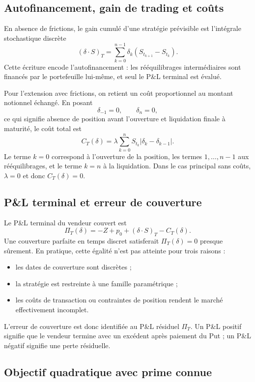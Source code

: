 \documentclass[11pt,a4paper]{article}
\begin{document}
\subsection{Autofinancement, gain de trading et coûts}

En absence de frictions, le gain cumulé d'une stratégie prévisible est
l'intégrale stochastique discrète
\[
(\delta\cdot S)_T
=\sum_{k=0}^{n-1}\delta_k\left(S_{t_{k+1}}-S_{t_k}\right).
\]
Cette écriture encode l'autofinancement : les rééquilibrages intermédiaires
sont financés par le portefeuille lui-même, et seul le P\&L terminal est évalué.

Pour l'extension avec frictions, on retient un coût proportionnel au montant
notionnel échangé. En posant
\[
\delta_{-1}=0,\qquad \delta_n=0,
\]
ce qui signifie absence de position avant l'ouverture et liquidation finale à
maturité, le coût total est
\[
C_T(\delta)
=\lambda\sum_{k=0}^{n}S_{t_k}\left|\delta_k-\delta_{k-1}\right|.
\]
Le terme $k=0$ correspond à l'ouverture de la position, les termes
$1,\ldots,n-1$ aux rééquilibrages, et le terme $k=n$ à la liquidation. Dans
le cas principal sans coûts, $\lambda=0$ et donc $C_T(\delta)=0$.

\subsection{P\&L terminal et erreur de couverture}

Le P\&L terminal du vendeur couvert est
\[
\Pi_T(\delta)
=-Z+p_0+(\delta\cdot S)_T-C_T(\delta).
\]
Une couverture parfaite en temps discret satisferait $\Pi_T(\delta)=0$ presque
sûrement. En pratique, cette égalité n'est pas atteinte pour trois raisons :
\begin{itemize}
\item les dates de couverture sont discrètes ;
\item la stratégie est restreinte à une famille paramétrique ;
\item les coûts de transaction ou contraintes de position rendent le marché
effectivement incomplet.
\end{itemize}
L'erreur de couverture est donc identifiée au P\&L résiduel $\Pi_T$. Un P\&L
positif signifie que le vendeur termine avec un excédent après paiement du Put ;
un P\&L négatif signifie une perte résiduelle.

\subsection{Objectif quadratique avec prime connue}
\end{document}
